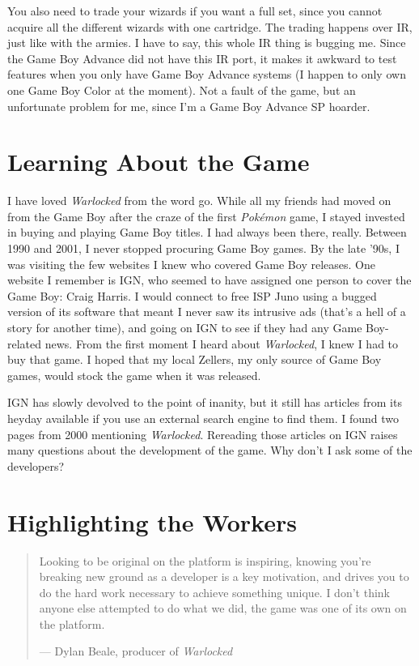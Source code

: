 \documentclass{book}
\begin{document}
You also need to trade your wizards if you want a full set, since you cannot acquire all the different wizards with one cartridge. The trading happens over IR, just like with the armies. I have to say, this whole IR thing is bugging me. Since the Game Boy Advance did not have this IR port, it makes it awkward to test features when you only have Game Boy Advance systems (I happen to only own one Game Boy Color at the moment). Not a fault of the game, but an unfortunate problem for me, since I’m a Game Boy Advance SP hoarder.

\FloatBarrier\needspace{10mm}\section*{Learning About the Game}\nopagebreak[4]

I have loved \emph{Warlocked} from the word go. While all my friends had moved on from the Game Boy after the craze of the first \emph{Pokémon} game, I stayed invested in buying and playing Game Boy titles. I had always been there, really. Between 1990 and 2001, I never stopped procuring Game Boy games. By the late ’90s, I was visiting the few websites I knew who covered Game Boy releases. One website I remember is IGN, who seemed to have assigned one person to cover the Game Boy: Craig Harris. I would connect to free ISP Juno using a bugged version of its software that meant I never saw its intrusive ads (that’s a hell of a story for another time), and going on IGN to see if they had any Game Boy-related news. From the first moment I heard about \emph{Warlocked}, I knew I had to buy that game. I hoped that my local Zellers, my only source of Game Boy games, would stock the game when it was released.

IGN has slowly devolved to the point of inanity, but it still has articles from its heyday available if you use an external search engine to find them. I found two pages from 2000 mentioning \emph{Warlocked}. Rereading those articles on IGN raises many questions about the development of the game. Why don’t I ask some of the developers?

\FloatBarrier\needspace{10mm}\section*{Highlighting the Workers}\nopagebreak[4]

\begin{quote}
Looking to be original on the platform is inspiring, knowing you’re breaking new ground as a developer is a key motivation, and drives you to do the hard work necessary to achieve something unique. I don’t think anyone else attempted to do what we did, the game was one of its own on the platform.

— Dylan Beale, producer of \emph{Warlocked}
\end{quote} \par
\end{document}
